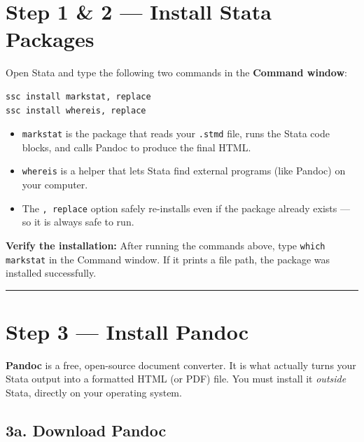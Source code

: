 \documentclass[paper=a4, fontsize=11pt]{scrartcl}
\newcommand{\horrule}[1]{\rule{\linewidth}{#1}}
\begin{document}
\section{Step 1 \& 2 --- Install Stata Packages}

Open Stata and type the following two commands in the \textbf{Command window}:

\begin{lstlisting}[style=stata]
ssc install markstat, replace
ssc install whereis, replace
\end{lstlisting}

\begin{itemize}
  \item \texttt{markstat} is the package that reads your \texttt{.stmd} file, runs the
        Stata code blocks, and calls Pandoc to produce the final HTML.
  \item \texttt{whereis} is a helper that lets Stata find external programs (like Pandoc)
        on your computer.
  \item The \texttt{, replace} option safely re-installs even if the package already
        exists --- so it is always safe to run.
\end{itemize}

\begin{tipbox}
\textbf{Verify the installation:} After running the commands above, type
\texttt{which markstat} in the Command window. If it prints a file path, the package
was installed successfully.
\end{tipbox}

\bigskip\horrule{0.4pt}\bigskip

\section{Step 3 --- Install Pandoc}

\textbf{Pandoc} is a free, open-source document converter. It is what actually turns
your Stata output into a formatted HTML (or PDF) file. You must install it
\textit{outside} Stata, directly on your operating system.

\subsection*{3a. Download Pandoc}
\end{document}
